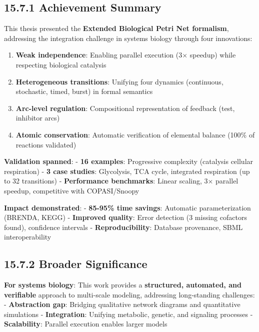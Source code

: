 \hypertarget{achievement-summary}{%
\subsection{15.7.1 Achievement Summary}\label{achievement-summary}}

This thesis presented the \textbf{Extended Biological Petri Net
formalism}, addressing the integration challenge in systems biology
through four innovations:

\begin{enumerate}
\def\labelenumi{\arabic{enumi}.}
\tightlist
\item
  \textbf{Weak independence}: Enabling parallel execution (3× speedup)
  while respecting biological catalysis
\item
  \textbf{Heterogeneous transitions}: Unifying four dynamics
  (continuous, stochastic, timed, burst) in formal semantics
\item
  \textbf{Arc-level regulation}: Compositional representation of
  feedback (test, inhibitor arcs)
\item
  \textbf{Atomic conservation}: Automatic verification of elemental
  balance (100\% of reactions validated)
\end{enumerate}

\textbf{Validation spanned}: - \textbf{16 examples}: Progressive
complexity (catalysis \textrightarrow cellular respiration) - \textbf{3 case studies}:
Glycolysis, TCA cycle, integrated respiration (up to 32 transitions) -
\textbf{Performance benchmarks}: Linear scaling, 3× parallel speedup,
competitive with COPASI/Snoopy

\textbf{Impact demonstrated}: - \textbf{85-95\% time savings}: Automatic
parameterization (BRENDA, KEGG) - \textbf{Improved quality}: Error
detection (3 missing cofactors found), confidence intervals -
\textbf{Reproducibility}: Database provenance, SBML interoperability

\hypertarget{broader-significance}{%
\subsection{15.7.2 Broader Significance}\label{broader-significance}}

\textbf{For systems biology}: This work provides a \textbf{structured,
automated, and verifiable} approach to multi-scale modeling, addressing
long-standing challenges: - \textbf{Abstraction gap}: Bridging
qualitative network diagrams and quantitative simulations -
\textbf{Integration}: Unifying metabolic, genetic, and signaling
processes - \textbf{Scalability}: Parallel execution enables larger
models

